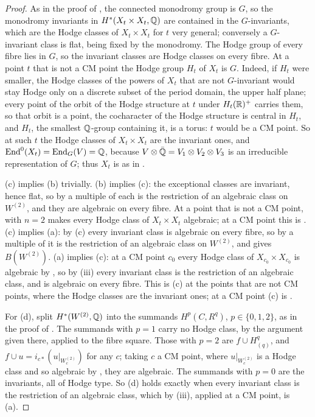 \begin{proof}
As in the proof of , the connected monodromy group
is $G$, so the monodromy invariants in $H^{*}(X_{t}\times X_{t},\mathbb{Q})$ are
contained in the $G$-invariants, which are the Hodge classes of
$X_{t}\times X_{t}$ for $t$ very general; conversely a $G$-invariant class is
flat, being fixed by the monodromy. The Hodge group of every fibre lies in
$G$, so the invariant classes are Hodge classes on every fibre. At a point $t$
that is not a CM point the Hodge group $H_{t}$ of $X_{t}$ is $G$. Indeed, if
$H_{t}$ were smaller, the Hodge classes of the powers of $X_{t}$ that are not
$G$-invariant would stay Hodge only on a discrete subset of the period
domain, the upper half plane; every point of the orbit of the Hodge structure
at $t$ under $H_{t}(\mathbb{R})^{+}$ carries them, so that orbit is a point, the
cocharacter of the Hodge structure is central in $H_{t}$, and $H_{t}$, the
smallest $\mathbb{Q}$-group containing it, is a torus: $t$ would be a CM point. So
at such $t$ the Hodge classes of $X_{t}\times X_{t}$ are the invariant ones,
and $\operatorname{End}^{0}(X_{t})=\operatorname{End}_{G}(V)=\mathbb{Q}$, because
$V\otimes\bar{\mathbb{Q}}=V_{1}\otimes V_{2}\otimes V_{3}$ is an irreducible
representation of $G$; thus $X_{t}$ is as in .

(c) implies (b) trivially. (b) implies (c): the exceptional classes are
invariant, hence flat, so by  a multiple of each is the
restriction of an algebraic class on $W^{(2)}$, and they are algebraic on
every fibre. At a point that is not a CM point,  with
$n=2$ makes every Hodge class of $X_{t}\times X_{t}$ algebraic; at a CM point
this is . (c) implies (a): by (c) every invariant class is
algebraic on every fibre, so by  a multiple of it is the
restriction of an algebraic class on $W^{(2)}$, and
 gives $B(W^{(2)})$. (a) implies (c): at a CM point
$c_{0}$ every Hodge class of $X_{c_{0}}\times X_{c_{0}}$ is algebraic by
, so by (iii) every
invariant class is the restriction of an algebraic class, and is algebraic on
every fibre. This is (c) at the points that are not CM points, where the
Hodge classes are the invariant ones; at a CM point (c) is
.

For (d), split $H^{*}(W^{(2)},\mathbb{Q})$ into the summands $H^{p}(C,R^{q})$,
$p\in\{0,1,2\}$, as in the proof of . The summands
with $p=1$ carry no Hodge class, by the argument given there, applied to the
fibre square. Those with $p=2$ are $f\cup H^{q}_{(q)}$, and
$f\cup u=i_{c*}(u|_{W^{(2)}_{c}})$ for any $c$; taking $c$ a CM point, where
$u|_{W^{(2)}_{c}}$ is a Hodge class and so algebraic by ,
they are algebraic. The summands with $p=0$ are the invariants, all of Hodge
type. So (d) holds exactly when every invariant class is the restriction of an
algebraic class, which by (iii), applied at a
CM point, is (a).
\end{proof}

